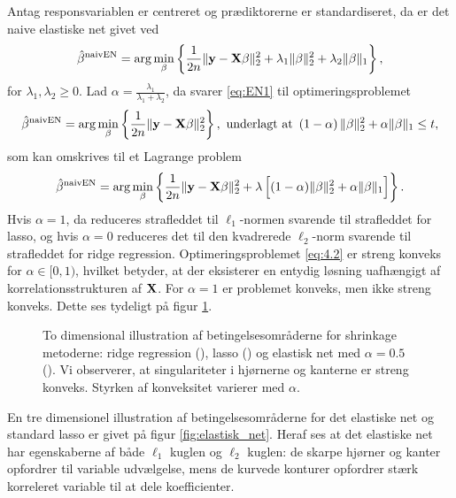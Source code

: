 Antag responsvariablen er centreret og prædiktorerne er standardiseret, da er det naive elastiske net givet ved
\begin{align}
\hat{\beta}^\text{naivEN} = \arg \min_{\beta} \cbr{ \frac{1}{2n} \Vert \y - \X \beta \Vert_2^2 + \lambda_1 \Vert \beta \Vert_2^2 + \lambda_2 \Vert \beta \Vert_1}, \label{eq:EN1}
\end{align}
for \(\lambda_1, \lambda_2 \geq 0\).
Lad \(\alpha = \frac{\lambda_1}{\lambda_1 + \lambda_2}\), da svarer \eqref{eq:EN1} til optimeringsproblemet
\begin{align*}
\hat{\beta}^\text{naivEN} = \arg \min_{\beta} \cbr{\frac{1}{2n} \Vert \y - \X \beta \Vert_2^2}, \ \text{underlagt at } \del{1-\alpha} \Vert \beta \Vert_2^2 + \alpha \Vert \beta \Vert_1 \leq t,
\end{align*}
som kan omskrives til et Lagrange problem
\begin{align}
\hat{\beta}^\text{naivEN} =\arg \min_{\beta} \cbr{\frac{1}{2n} \Vert \y - \X \beta \Vert_2^2 + \lambda \sbr{(1- \alpha) \Vert \beta \Vert_2^2 + \alpha \Vert \beta \Vert_1}}. \label{eq:4.2}
\end{align}
Hvis $\alpha=1$, da reduceres strafleddet til $\ell_1$-normen svarende til strafleddet for lasso, og hvis $\alpha=0$ reduceres det til den kvadrerede $\ell_2$-norm svarende til strafleddet for ridge regression.
Optimeringsproblemet  \eqref{eq:4.2} er streng konveks for \(\alpha \in [0,1)\), hvilket betyder, at der eksisterer en entydig løsning uafhængigt af korrelationsstrukturen af $\mathbf{X}$.
For  \(\alpha=1\) er problemet konveks, men ikke streng konveks.
Dette ses tydeligt på figur \ref{fig:elastisk}.
%
\begin{figure}[H]
\centering
\scalebox{0.8}{}
\caption[optional short text]{To dimensional illustration af betingelsesområderne for shrinkage metoderne: ridge regression (), lasso () og elastisk net med \(\alpha = 0.5\) (). Vi observerer, at singulariteter i hjørnerne og kanterne er streng konveks. Styrken af konveksitet varierer med \(\alpha\).} \label{fig:elastisk}
\end{figure}
%
En tre dimensionel illustration af betingelsesområderne for det elastiske net og standard lasso er givet på figur \ref{fig:elastisk_net}.
Heraf ses at det elastiske net har egenskaberne af både $\ell_1$ kuglen og $\ell_2$ kuglen: de skarpe hjørner og kanter opfordrer til variable udvælgelse, mens de kurvede konturer opfordrer stærk korreleret variable til at dele koefficienter.
